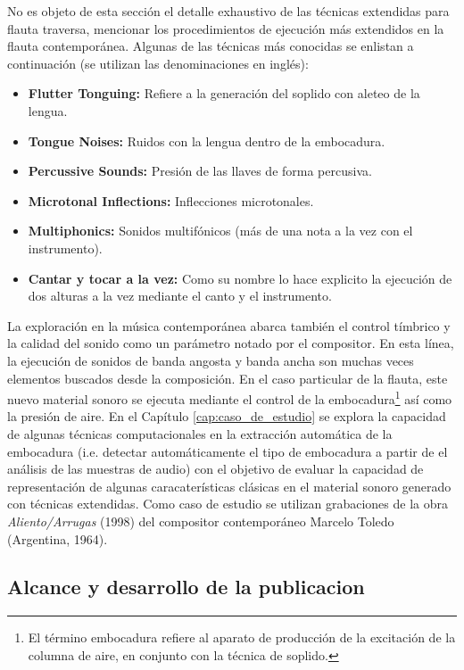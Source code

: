 \documentclass
  [ams,pdfout]%
	{aeslac}
\begin{document}
No es objeto de esta sección el detalle exhaustivo de las técnicas extendidas para flauta traversa, mencionar los procedimientos de ejecución más extendidos en la flauta contemporánea. Algunas de las técnicas más conocidas se enlistan a continuación (se utilizan las denominaciones en inglés):

\begin{itemize}

\item \textbf{Flutter Tonguing:} Refiere a la generación del soplido con aleteo de la lengua. 
\item \textbf{Tongue Noises:} Ruidos con la lengua dentro de la embocadura. 
\item \textbf{Percussive Sounds:} Presión de las llaves de forma percusiva.
\item \textbf{Microtonal Inflections:} Inflecciones microtonales.
\item \textbf{Multiphonics:} Sonidos multifónicos (más de una nota a la vez con el instrumento).
\item \textbf{Cantar y tocar a la vez:} Como su nombre lo hace explicito la ejecución de dos alturas a la vez mediante el canto y el instrumento.

\end{itemize}

La exploración en la música contemporánea abarca también el control tímbrico y la calidad del sonido como un parámetro notado por el compositor. En esta línea, la ejecución de sonidos de banda angosta y banda ancha son muchas veces elementos buscados desde la composición. En el caso particular de la flauta, este nuevo material sonoro se ejecuta mediante el control de la embocadura\footnote{El término embocadura refiere al aparato de producción de la excitación de la columna de aire, en conjunto con la técnica de soplido.} así como la presión de aire. En el Capítulo \ref{cap:caso_de_estudio} se explora la capacidad de algunas técnicas computacionales en la extracción automática de la embocadura (i.e. detectar automáticamente el tipo de embocadura a partir de el análisis de las muestras de audio) con el objetivo de evaluar la capacidad de representación de algunas caracaterísticas clásicas en el material sonoro generado con técnicas extendidas. Como caso de estudio se utilizan grabaciones de la obra \textit{Aliento/Arrugas} (1998) del compositor contemporáneo Marcelo Toledo (Argentina, 1964). 

\subsection{Alcance y desarrollo de la publicacion}
%
\end{document}
